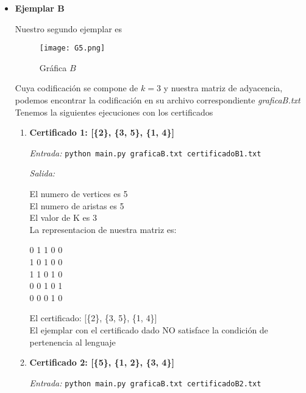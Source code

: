 \documentclass[12pt,letterpaper]{article}
\begin{document}
\begin{itemize}
\begin{itemize}
        \newpage
        \item \textbf{Ejemplar B}
        
        Nuestro segundo ejemplar es
        
        \begin{figure}[htb]
        \centering
        \texttt{[image: G5.png]}
        \caption{Gráfica $B$}
        \end{figure}

        Cuya codificación se compone de $k=3$ y nuestra matriz de adyacencia, podemos encontrar la codificación en su archivo correspondiente \textit{graficaB.txt}\\
        Tenemos la siguientes ejecuciones con los certificados
        
        \begin{enumerate}
            \item \textbf{Certificado 1: [\{2\}, \{3, 5\}, \{1, 4\}]}
            
            \textit{Entrada:}
            \texttt{python main.py graficaB.txt certificadoB1.txt}
            
            \textit{Salida:}

            El numero de vertices es 5 \\
            El numero de aristas es 5 \\
            El valor de K es 3 \\
            La representacion de nuestra matriz es:
            \begin{center}
                0 1 1 0 0 \\
                1 0 1 0 0 \\
                1 1 0 1 0 \\
                0 0 1 0 1 \\
                0 0 0 1 0 \\
            \end{center}
            El certificado: [\{2\}, \{3, 5\}, \{1, 4\}] \\
            El ejemplar con el certificado dado NO satisface la condición
            de pertenencia al lenguaje
            
            \newpage
            \item \textbf{Certificado 2: [\{5\}, \{1, 2\}, \{3, 4\}]}
            
            \textit{Entrada:} \texttt{python main.py graficaB.txt certificadoB2.txt} 
            

\end{enumerate}
\end{itemize}
\end{itemize}
\end{document}
